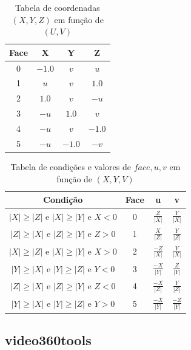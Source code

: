 \begin{table}[htbp]
	\centering
	\caption{Tabela de coordenadas $(X, Y, Z)$ em função de $(U, V)$}
	\label{tab:uv_erp}
	\begin{tabular}{|c|c|c|c|}
		\hline
		\textbf{Face} & \textbf{X} & \textbf{Y} & \textbf{Z} \\
		\hline
		0 & $-1.0$ & $v$    & $u$    \\
		1 & $u$    & $v$    & $1.0$  \\
		2 & $1.0$  & $v$    & $-u$   \\
		3 & $-u$   & $1.0$  & $v$    \\
		4 & $-u$   & $v$    & $-1.0$ \\
		5 & $-u$   & $-1.0$ & $-v$   \\
		\hline
	\end{tabular}
\end{table}

\begin{table}[htbp]
	\centering
	\caption{Tabela de condições e valores de \( face, u, v \) em função de $(X, Y, V)$}
	\label{tab:condicoes}
	\begin{tabular}{|c|c|c|c|}
		\hline
		\textbf{Condição} & \textbf{Face} & \textbf{u} & \textbf{v} \\
		\hline
		$ |X| \geq |Z|  \text{ e }  |X| \geq |Y|  \text{ e }  X < 0 $ & 0 &  $\frac{Z}{|X|}$ & $ \frac{Y}{|X|} $ \\
		$ |Z| \geq |X|  \text{ e }  |Z| \geq |Y|  \text{ e }  Z > 0 $ & 1 &  $\frac{X}{|Z|}$ & $ \frac{Y}{|Z|} $ \\
		$ |X| \geq |Z|  \text{ e }  |X| \geq |Y|  \text{ e }  X > 0 $ & 2 &  $\frac{-Z}{|X|}$  & $ \frac{Y}{|X|} $ \\
		$ |Y| \geq |X|  \text{ e }  |Y| \geq |Z|  \text{ e }  Y < 0 $ & 3 &  $\frac{-X}{|Y|} $ & $ \frac{Z}{|Y|} $ \\
		$ |Z| \geq |X|  \text{ e }  |Z| \geq |Y|  \text{ e }  Z < 0 $ & 4 &  $\frac{-X}{|Z|}$  & $ \frac{Y}{|Z|} $ \\
		$ |Y| \geq |X|  \text{ e }  |Y| \geq |Z|  \text{ e }  Y > 0 $ & 5 &  $\frac{-X}{|Y|}$  & $ \frac{-Z}{|Y|} $ \\
		\hline
	\end{tabular}
\end{table}


\subsection{video360tools}

